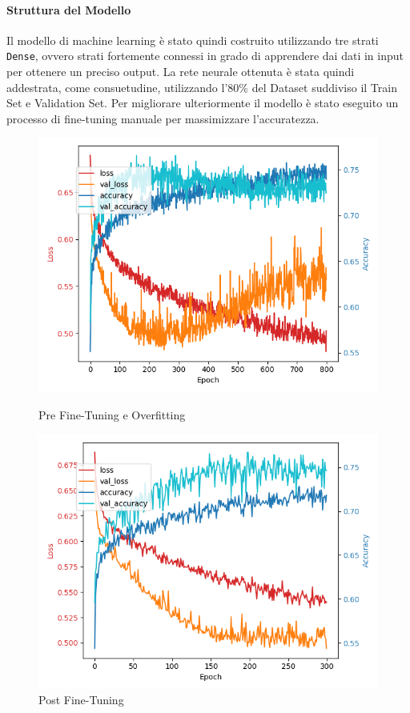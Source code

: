 \paragraph{Struttura del Modello}
Il modello di machine learning è stato quindi costruito utilizzando tre strati \texttt{Dense}, ovvero strati fortemente connessi in grado di apprendere dai dati in input per ottenere un preciso output. La rete neurale ottenuta è stata quindi addestrata, come consuetudine, utilizzando l'80\% del Dataset suddiviso il Train Set e Validation Set.
Per migliorare ulteriormente il modello è stato eseguito un processo di fine-tuning manuale per massimizzare l'accuratezza.

\begin{figure}[H]
    \centering
    \begin{minipage}[b]{0.45\linewidth}
        \centering
        \includegraphics[width=\linewidth]{img/final800.png}
        \caption{Pre Fine-Tuning e Overfitting}
        \label{fig:first_label}
    \end{minipage}
    \hspace{0.05\linewidth}
    \begin{minipage}[b]{0.45\linewidth}
        \centering
        \includegraphics[width=\linewidth]{img/final_mlp.png}
        \caption{Post Fine-Tuning}
        \label{fig:second_label}
    \end{minipage}
\end{figure}

